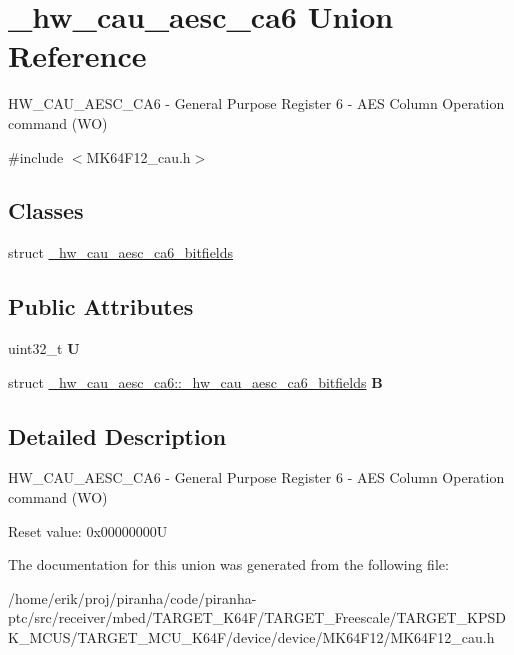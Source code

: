 \hypertarget{union__hw__cau__aesc__ca6}{}\section{\+\_\+hw\+\_\+cau\+\_\+aesc\+\_\+ca6 Union Reference}
\label{union__hw__cau__aesc__ca6}


H\+W\+\_\+\+C\+A\+U\+\_\+\+A\+E\+S\+C\+\_\+\+C\+A6 -\/ General Purpose Register 6 -\/ A\+ES Column Operation command (WO)  




{\ttfamily \#include $<$M\+K64\+F12\+\_\+cau.\+h$>$}

\subsection*{Classes}
\begin{DoxyCompactItemize}
\item 
struct \hyperlink{struct__hw__cau__aesc__ca6_1_1__hw__cau__aesc__ca6__bitfields}{\+\_\+hw\+\_\+cau\+\_\+aesc\+\_\+ca6\+\_\+bitfields}
\end{DoxyCompactItemize}
\subsection*{Public Attributes}
\begin{DoxyCompactItemize}
\item 
uint32\+\_\+t {\bfseries U}\hypertarget{union__hw__cau__aesc__ca6_a730bedba6c74f439c9acb43130098865}{}\label{union__hw__cau__aesc__ca6_a730bedba6c74f439c9acb43130098865}

\item 
struct \hyperlink{struct__hw__cau__aesc__ca6_1_1__hw__cau__aesc__ca6__bitfields}{\+\_\+hw\+\_\+cau\+\_\+aesc\+\_\+ca6\+::\+\_\+hw\+\_\+cau\+\_\+aesc\+\_\+ca6\+\_\+bitfields} {\bfseries B}\hypertarget{union__hw__cau__aesc__ca6_a65486898ed18d0ddc3a49310d0d7d907}{}\label{union__hw__cau__aesc__ca6_a65486898ed18d0ddc3a49310d0d7d907}

\end{DoxyCompactItemize}


\subsection{Detailed Description}
H\+W\+\_\+\+C\+A\+U\+\_\+\+A\+E\+S\+C\+\_\+\+C\+A6 -\/ General Purpose Register 6 -\/ A\+ES Column Operation command (WO) 

Reset value\+: 0x00000000U 

The documentation for this union was generated from the following file\+:\begin{DoxyCompactItemize}
\item 
/home/erik/proj/piranha/code/piranha-\/ptc/src/receiver/mbed/\+T\+A\+R\+G\+E\+T\+\_\+\+K64\+F/\+T\+A\+R\+G\+E\+T\+\_\+\+Freescale/\+T\+A\+R\+G\+E\+T\+\_\+\+K\+P\+S\+D\+K\+\_\+\+M\+C\+U\+S/\+T\+A\+R\+G\+E\+T\+\_\+\+M\+C\+U\+\_\+\+K64\+F/device/device/\+M\+K64\+F12/M\+K64\+F12\+\_\+cau.\+h\end{DoxyCompactItemize}
